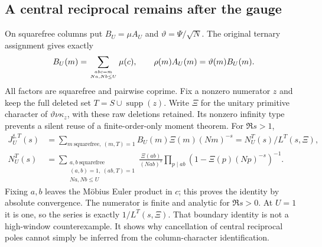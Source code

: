 \documentclass[11pt]{article}
\theoremstyle{definition}\newtheorem{definition}[theorem]{Definition}
\theoremstyle{remark}\newtheorem{remark}[theorem]{Remark}
\begin{document}
\subsection{A central reciprocal remains after the gauge}
On squarefree columns put $B_U=\mu A_U$ and
$\vartheta=\Psi/\sqrt N$. The original ternary assignment gives exactly
\[
 B_U(m)=\sum_{abc=m\atop Na,Nb\le U}\mu(c),\qquad
 \rho(m)A_U(m)=\vartheta(m)B_U(m).
\]
All factors are squarefree and pairwise coprime. Fix a nonzero numerator
$z$ and keep the full deleted set $T=S\cup\operatorname{supp}(z)$.
Write $\Xi$ for the unitary primitive character of
$\vartheta\nu\kappa_z$, with these raw deletions retained.
Its nonzero infinity type prevents a silent reuse of a finite-order-only
moment theorem. For $\Re s>1$,
\begin{align*}
 J_U^{\sharp,T}(s)&=\sum_{m\ \mathrm{squarefree},\ (m,T)=1}
                   B_U(m)\Xi(m)(Nm)^{-s}=N_U^T(s)/L^T(s,\Xi),\\
 N_U^T(s)&=\sum_{\substack{a,b\ \mathrm{squarefree}\\(a,b)=1,\ (ab,T)=1\\Na,Nb\le U}}
 \frac{\Xi(ab)}{(Nab)^s}\prod_{p\mid ab}(1-\Xi(p)(Np)^{-s})^{-1}.
\end{align*}
Fixing $a,b$ leaves the M\"obius Euler product in $c$; this proves the
identity by absolute convergence. The numerator is finite and analytic
for $\Re s>0$. At $U=1$ it is one, so the series is exactly $1/L^T(s,\Xi)$.
That boundary identity is not a high-window counterexample. It shows why
cancellation of central reciprocal poles cannot simply be inferred from
the column-character identification.
\end{document}

